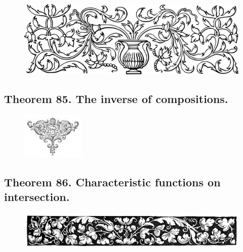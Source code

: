 \documentclass[preview]{standalone}
\begin{document}
\begin{figure}[!h]
    \centering
    \includegraphics[width=14cm]{../resources/jpg/2.3.functions/border1.png}
\end{figure}
\subsection[The inverse of compositions.]
    {
        \color{section}Theorem 85. \color{black} The inverse of compositions.
    }

\begin{figure}[!h]
    \centering
    \includegraphics[width=3cm]{../resources/jpg/2.3.functions/symbol6.jpg}
\end{figure}
\pagebreak


\subsection[Characteristic functions on intersections.]
    {
        \color{section}Theorem 86. \color{black} Characteristic functions on intersection.
    }

\begin{figure}[!h]
    \centering
    \includegraphics[width=14.25cm]{../resources/jpg/2.3.functions/border2.jpg}
\end{figure}
\pagebreak
\end{document}
